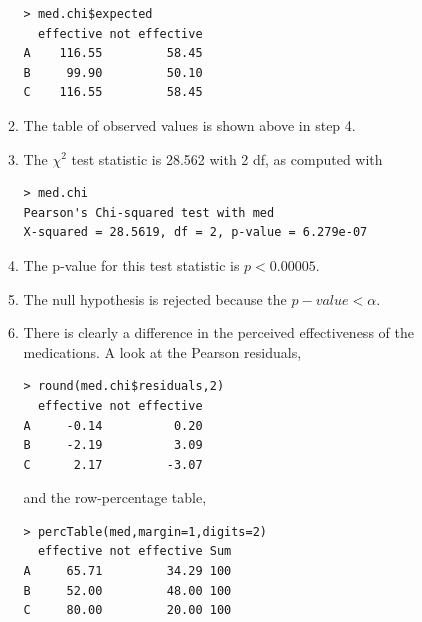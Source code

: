 \documentclass[10pt,openany]{book}\usepackage[]{graphicx}\usepackage[]{color}
\makeatletter
\newenvironment{kframe}{%
 \def\at@end@of@kframe{}%
 \ifinner\ifhmode%
  \def\at@end@of@kframe{\end{minipage}}%
  \begin{minipage}{\columnwidth}%
 \fi\fi%
 \def\FrameCommand##1{\hskip\@totalleftmargin \hskip-\fboxsep
 \colorbox{shadecolor}{##1}\hskip-\fboxsep
     \hskip-\linewidth \hskip-\@totalleftmargin \hskip\columnwidth}%
 \MakeFramed {\advance\hsize-\width
   \@totalleftmargin\z@ \linewidth\hsize
   \@setminipage}}%
 {\par\unskip\endMakeFramed%
 \at@end@of@kframe}
\newenvironment{knitrout}{}{} %
\makeatother
\begin{document}
\begin{itemize}
\begin{enumerate}
\begin{knitrout}
\color{fgcolor}\begin{kframe}
\begin{verbatim}
> med.chi$expected
  effective not effective
A    116.55         58.45
B     99.90         50.10
C    116.55         58.45
\end{verbatim}
\end{kframe}
\end{knitrout}
      \item The table of observed values is shown above in step 4.
      \item The $\chi^{2}$ test statistic is 28.562 with 2 df, as computed with
\begin{knitrout}
\color{fgcolor}\begin{kframe}
\begin{verbatim}
> med.chi
Pearson's Chi-squared test with med 
X-squared = 28.5619, df = 2, p-value = 6.279e-07
\end{verbatim}
\end{kframe}
\end{knitrout}
      \item The p-value for this test statistic is $p<0.00005$.
      \item The null hypothesis is rejected because the $p-value<\alpha$.
      \item There is clearly a difference in the perceived effectiveness of the medications.  A look at the Pearson residuals,
\begin{knitrout}
\color{fgcolor}\begin{kframe}
\begin{verbatim}
> round(med.chi$residuals,2)
  effective not effective
A     -0.14          0.20
B     -2.19          3.09
C      2.17         -3.07
\end{verbatim}
\end{kframe}
\end{knitrout}
and the row-percentage table,
\begin{knitrout}
\color{fgcolor}\begin{kframe}
\begin{verbatim}
> percTable(med,margin=1,digits=2)
  effective not effective Sum
A     65.71         34.29 100
B     52.00         48.00 100
C     80.00         20.00 100
\end{verbatim}
\end{kframe}

\end{knitrout}
\end{enumerate}
\end{itemize}
\end{document}
